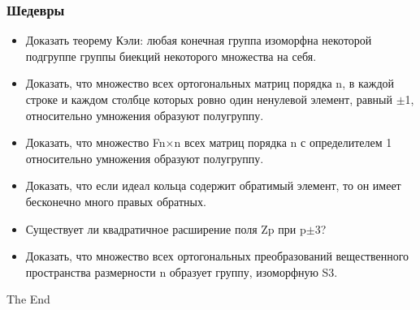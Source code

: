 \documentclass[10pt, pdf,utf8,russian]{beamer}
\begin{document}

\begin{frame}
	\frametitle{Шедевры}
	\begin{itemize}
		\item Доказать теорему Кэли: любая конечная группа изоморфна некоторой подгруппе группы биекций некоторого множества на себя.
		\item Доказать, что множество всех ортогональных матриц порядка n, в каждой строке и каждом столбце которых ровно один ненулевой элемент, равный $\pm$1, относительно умножения образуют полугруппу.
		\item Доказать, что множество Fn$\times$n всех матриц порядка n с определителем 1 относительно умножения образуют полугруппу.
		\item Доказать, что если идеал кольца содержит обратимый элемент, то он имеет бесконечно много правых обратных.
		\item Существует ли квадратичное расширение поля Zp при p$\pm$3?
		\item Доказать, что множество всех ортогональных преобразований вещественного пространства размерности n образует группу, изоморфную S3.
	\end{itemize}
\end{frame}


\begin{frame}
\Huge{\centerline{The End}}
\end{frame}

\end{document}
